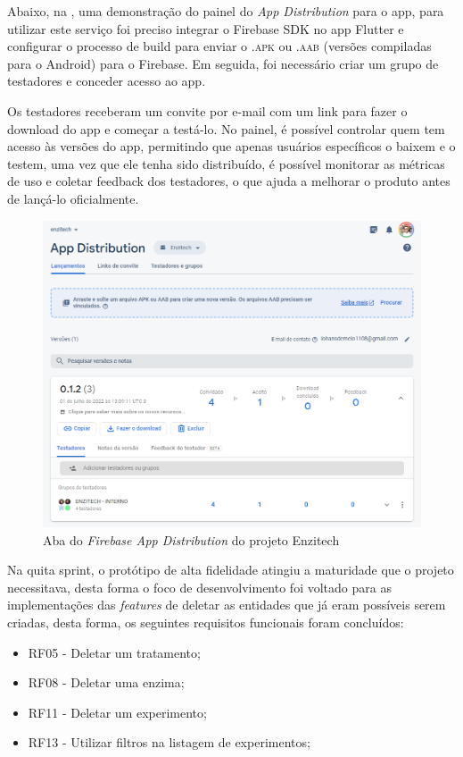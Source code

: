  Abaixo, na , uma demonstração do painel do \textit{App Distribution} para o \ac{app}, para utilizar este serviço foi preciso integrar o Firebase SDK no \ac{app} Flutter e configurar o processo de build para enviar o \textsc{.apk} ou \textsc{.aab} (versões compiladas para o Android) para o Firebase. Em seguida, foi necessário criar um grupo de testadores e conceder acesso ao \ac{app}.

Os testadores receberam um convite por e-mail com um link para fazer o download do \ac{app} e começar a testá-lo. No painel, é possível controlar quem tem acesso às versões do \ac{app}, permitindo que apenas usuários específicos o baixem e o testem, uma vez que ele tenha sido distribuído, é possível monitorar as métricas de uso e coletar feedback dos testadores, o que ajuda a melhorar o produto antes de lançá-lo oficialmente.

\begin{figure}[H]
\centering
  \includegraphics[width=\columnwidth]{images/app_distribution.png}
  \caption{Aba do \textit{Firebase App Distribution} do projeto Enzitech}
  \label{fig:app_distribution}
\end{figure}
 
Na quita sprint, o protótipo de alta fidelidade atingiu a maturidade que o projeto necessitava, desta forma o foco de desenvolvimento foi voltado para as implementações das \textit{features} de deletar as entidades que já eram possíveis serem criadas, desta forma, os seguintes requisitos funcionais foram concluídos:
\begin{itemize}
   \item RF05 - Deletar um tratamento;
   \item RF08 - Deletar uma enzima;
   \item RF11 - Deletar um experimento;
   \item RF13 - Utilizar filtros na listagem de experimentos;
 \end{itemize}

